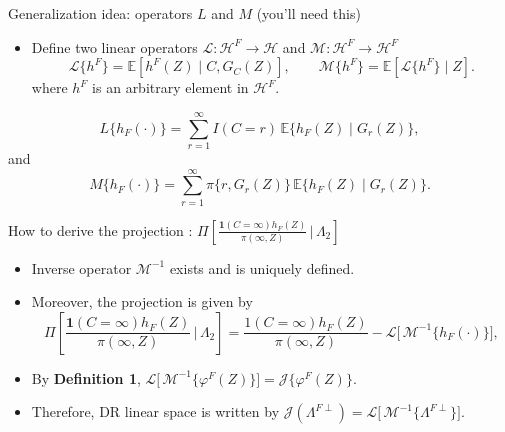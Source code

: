 \documentclass[xcolor=dvipsnames,aspectratio=169]{beamer}
\newcommand{\E}{\mathbb{E}}
\newcommand{\1}{\mathbbm{1}}
\begin{document}
\begin{frame}{Generalization idea: operators $L$ and $M$ (you’ll need this)}
  \begin{tcolorbox}[colframe=red,title=Definition 4 and 5]
    \begin{itemize}
      \item Define two linear operators $\mathcal{L}:\mathcal{H}^{F}\to\mathcal{H}$ and  $\mathcal{M}:\mathcal{H}^{F}\to\mathcal{H}^{F}$
      \[
        \mathcal{L}\{h^{F}\} = \E\!\left[h^{F}(Z)\mid C,G_C(Z)\right],
        \qquad
        \mathcal{M}\{h^{F}\} = \E\!\left[\mathcal{L}\{h^{F}\}\mid Z\right].
      \]
      where $h^F$ is an arbitrary element in $\mathcal{H}^F$.
    \end{itemize}
  \end{tcolorbox}
    \[
        L\{h_F(\cdot)\} = \sum_{r=1}^{\infty} I(C=r)\,\E\{h_F(Z)\mid G_r(Z)\},
    \]
    and 
    \[
        M\{h_F(\cdot)\} = \sum_{r=1}^{\infty} \pi\{r,G_r(Z)\}\,\E\{h_F(Z)\mid G_r(Z)\}.
    \]
\end{frame}

\begin{frame}{How to derive the projection : $\Pi\!\left[
        \frac{\mathbf{1}(C=\infty)h_F(Z)}{\pi(\infty,Z)}
        \,\Bigg|\, \Lambda_2
        \right]$}
  \begin{tcolorbox}[colframe=Cyan,title=Theorem 10.6]
    \begin{itemize}
      \item Inverse operator $\mathcal{M}^{-1}$ exists and is uniquely defined. 
      \item Moreover, the projection is given by
      \[
        \Pi\!\left[
        \frac{\mathbf{1}(C=\infty)h_F(Z)}{\pi(\infty,Z)}
        \,\Bigg|\, \Lambda_2
        \right]
        = \frac{\mathcal{1} (C=\infty)h_F(Z)}{\pi(\infty,Z)} 
        - \mathcal{L}\!\big[\,\mathcal{M}^{-1}\{h_F(\cdot)\}\big],
    \]
    \end{itemize}
  \end{tcolorbox}
  \begin{itemize}
    \item By \textbf{Definition 1}, $\mathcal{L}\!\big[\,\mathcal{M}^{-1}\{\varphi^F(Z)\}\big]=\mathcal{J}\{\varphi^F(Z)\}$.
    \item Therefore, DR linear space is written by $\mathcal{J}(\Lambda^{F\perp})=\mathcal{L}\!\big[\,\mathcal{M}^{-1}\{\Lambda^{F\perp}\}\big]$.
  \end{itemize}
\end{frame}
\end{document}
